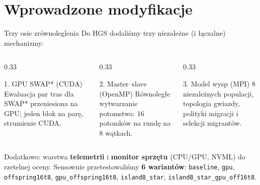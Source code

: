 \documentclass[aspectratio=169,11pt]{beamer}
\begin{document}
\section{Wprowadzone modyfikacje}
\begin{frame}{Trzy osie zrównoleglenia}
  Do HGS dodaliśmy trzy niezależne (i łączalne) mechanizmy:
  \vfill
  \begin{columns}[T]
    \begin{column}{0.33\textwidth}
      \begin{block}{1. GPU SWAP* (CUDA)}
        \footnotesize Ewaluacja par tras dla SWAP* przeniesiona na GPU; jeden blok na parę, strumienie CUDA.
      \end{block}
    \end{column}
    \begin{column}{0.33\textwidth}
      \begin{block}{2. Master--slave (OpenMP)}
        \footnotesize Równoległe wytwarzanie potomstwa: 16 potomków na rundę na 8 wątkach.
      \end{block}
    \end{column}
    \begin{column}{0.33\textwidth}
      \begin{block}{3. Model wysp (MPI)}
        \footnotesize 8 niezależnych populacji, topologia gwiazdy, polityki migracji i selekcji migrantów.
      \end{block}
    \end{column}
  \end{columns}
  \vfill
  Dodatkowo: warstwa \textbf{telemetrii} i \textbf{monitor sprzętu} (CPU/GPU, NVML) do rzetelnej oceny.
  \vfill
  {\footnotesize Sensownie przetestowaliśmy \textbf{6 wariantów}: \texttt{baseline}, \texttt{gpu}, \texttt{offspring16t8}, \texttt{gpu\_offspring16t8}, \texttt{island8\_star}, \texttt{island8\_star\_gpu\_off16t8}.}
\end{frame}
\end{document}
